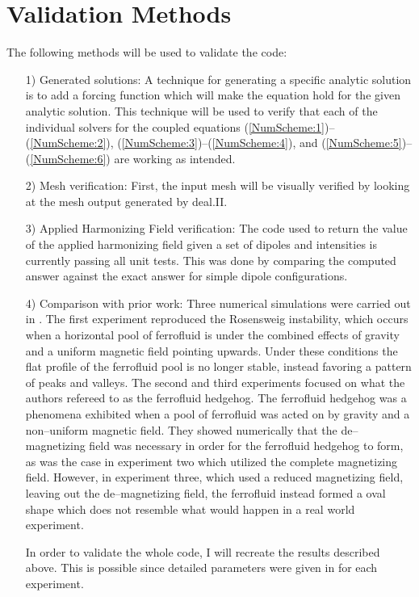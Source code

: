 \documentclass[11pt,fullpage]{article}
\theoremstyle{lemma}
\theoremstyle{definition}
\theoremstyle{lemma}
\begin{document}
\section{Validation Methods}
The following methods will be used to validate the code:
\begin{itemize}
	\item[1)] Generated solutions: A technique for generating a specific analytic solution is to add a forcing function which will make the equation hold for the given analytic solution. This technique will be used to verify that each of the individual solvers for the coupled equations (\ref{NumScheme:1})--(\ref{NumScheme:2}), (\ref{NumScheme:3})--(\ref{NumScheme:4}), and (\ref{NumScheme:5})--(\ref{NumScheme:6}) are working as intended.
	
	\item[2)] Mesh verification: First, the input mesh will be visually verified by looking at the mesh output generated by deal.II.
	
	\item[3)] Applied Harmonizing Field verification: The code used to return the value of the applied harmonizing field given a set of dipoles and intensities is currently passing all unit tests. This was done by comparing the computed answer against the exact answer for simple dipole configurations.
	
	\item[4)] Comparison with prior work: Three numerical simulations were carried out in \cite{DiffuseInterface}. The first experiment reproduced the Rosensweig instability, which occurs when a horizontal pool of ferrofluid is under the combined effects of gravity and a uniform magnetic field pointing upwards. Under these conditions the flat profile of the ferrofluid pool is no longer stable, instead favoring a pattern of peaks and valleys. The second and third experiments focused on what the authors refereed to as the ferrofluid hedgehog. The ferrofluid hedgehog was a phenomena exhibited when a pool of ferrofluid was acted on by gravity and a non--uniform magnetic field. They showed numerically that the de--magnetizing field was necessary in order for the ferrofluid hedgehog to form, as was the case in experiment two which utilized the complete magnetizing field. However, in experiment three, which used a reduced magnetizing field, leaving out the de--magnetizing field, the ferrofluid instead formed a oval shape which does not resemble what would happen in a real world experiment.
	
	In order to validate the whole code, I will recreate the results described above. This is possible since detailed parameters were given in \cite{DiffuseInterface} for each experiment.
\end{itemize}
\end{document}
